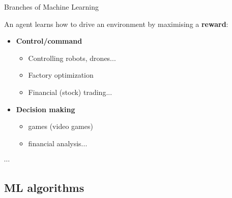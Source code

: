 \documentclass[10pt,serif,mathserif,compress,hyperref={colorlinks}]{beamer}
\begin{document}
\begin{frame}{Branches of Machine Learning}  
  \begin{tcolorbox}[title=Reinforcement learning]
    An agent learns how to drive an environment by maximising a \textbf{reward}:
    \begin{itemize}

    \item \textbf{Control/command}
      \begin{itemize}
      \item Controlling robots, drones...
      \item Factory optimization
      \item Financial (stock) trading...
      \end{itemize}        
    \item \textbf{Decision making}
      \begin{itemize}
      \item games (video games)
      \item financial analysis...
      \end{itemize}
    \end{itemize}
    \vspace*{-1mm}$\cdots$
  \end{tcolorbox}    
\end{frame}

\subsection{ML algorithms}
\end{document}
